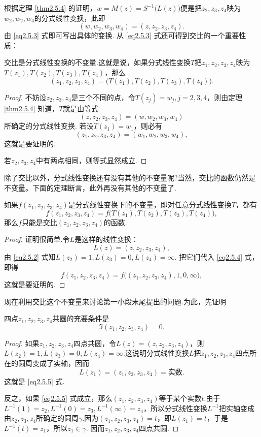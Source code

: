 根据定理 \ref{thm2.5.4} 的证明，$w=M(z)=S^{-1}\big(L(z)\big)$便是把$z_2,z_3,z_4$映为$w_2,w_2,w_4$的分式线性变换，此即
\begin{equation}\label{eq2.5.3}
(w,w_2,w_3,w_4)=(z,z_2,z_3,z_4).
\end{equation}
由 \eqref{eq2.5.3} 式即可写出具体的变换. 从 \eqref{eq2.5.3} 式还可得到交比的一个重要性质：
\begin{theorem}\label{thm2.5.5}
交比是分式线性变换的不变量.这就是说，如果分式线性变换$T$把$z_1,z_2,z_3,z_4$映为$T(z_1),T(z_2),T(z_3),T(z_4)$，那么
\[(z_1,z_2,z_3,z_4)=\big(T(z_1),T(z_2),T(z_3),T(z_4)\big).\]
\end{theorem}
\begin{proof}
不妨设$z_2,z_3,z_4$是三个不同的点，令$T(z_j)=w_j,j=2,3,4$，则由定理 \ref{thm2.5.4} 知道，$T$就是由等式
\[(z,z_2,z_3,z_4)=(w,w_2,w_3,w_4)\]
所确定的分式线性变换. 若设$T(z_1)=w_1$，则必有
\[(z_1,z_2,z_3,z_4)=(w_1,w_2,w_3,w_4),\]
这就是要证明的.

若$z_2,z_3,z_4$中有两点相同，则等式显然成立.
\end{proof}

除了交比以外，分式线性变换还有没有其他的不变量呢?当然，交比的函数仍然是不变量。下面的定理断言，此外再没有其他的不变量了.
\begin{theorem}\label{thm2.5.6}
如果$f(z_1,z_2,z_3,z_4)$是分式线性变换下的不变量，即对任意分式线性变换$T$，都有
\begin{equation}\label{eq2.5.4}
f(z_1,z_2,z_3,z_4)=f\big(T(z_1),T(z_2),T(z_3),T(z_4)\big),
\end{equation}
那么$f$只能是交比$(z_1,z_2,z_3,z_4)$的函数.
\end{theorem}
\begin{proof}
证明很简单.令$L$是这样的线性变换：
\[L(z)=(z,z_2,z_3,z_4),\]
由 \eqref{eq2.5.2} 式知$L(z_2)=1,L(z_3)=0,L(z_4)=\infty$. 把它们代入 \eqref{eq2.5.4} 式，即得
\[f(z_1,z_2,z_3,z_4)=f\big((z_1,z_2,z_3,z_4),1,0,\infty\big),\]
这就是要证明的.
\end{proof}

现在利用交比这个不变量来讨论第一小段末尾提出的问题.为此，先证明
\begin{prop}\label{prop2.5.7}
四点$z_1,z_2,z_3,z_4$共圆的充要条件是
\begin{equation}\label{eq2.5.5}
\Im(z_1,z_2,z_3,z_4)=0.
\end{equation}
\end{prop}
\begin{proof}
如果$z_1,z_2,z_3,z_4$四点共圆，令$L(z)=(z,z_2,z_3,z_4)$，则$L(z_2)=1,L(z_3)=0,L(z_4)=\infty$.这说明分式线性变换$L$把$z_1,z_2,z_3,z_4$四点所在的圆周变成了实轴，因而
\[L(z_1)=(z_1,z_2,z_3,z_4)=\text{实数}.\]
这就是 \eqref{eq2.5.5} 式.

反之，如果 \eqref{eq2.5.5} 式成立，那么$(z_1,z_2,z_3,z_4)$等于某个实数$t$.由于$L^{-1}(1)=z_2,L^{-1}(0)=z_3,L^{-1}(\infty)=z_4$，所以分式线性变换$L^{-1}$把实轴变成由$z_2,z_3,z_4$所确定的圆周$\gamma$.因为$(z_1,z_2,z_3,z_4)=t$，即$L(z_1)=t$，于是$L^{-1}(t)=z_1$，所以$z_1\in\gamma$. 因而$z_1,z_2,z_3,z_4$四点共圆.
\end{proof}

